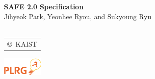 \documentclass[oneside,openany,a4paper,10pt]{book}
\begin{document}
\begin{titlepage}
    \vspace*{15em}
    \centering
    {\bfseries\Huge
        SAFE 2.0 Specification\\
    }    
        \vskip2cm
       {\Large
 Jihyeok Park, Yeonhee Ryou, and Sukyoung Ryu}\\
~\\
\large
\begin{tabular}{c}
                        \copyright\ KAIST
\end{tabular}
\includegraphics[width=2cm]{plrg-logo.png}
\end{titlepage}

\multibegin
\raggedcolumns

\tableofcontents







\normalsize



\multiend
\end{document}
